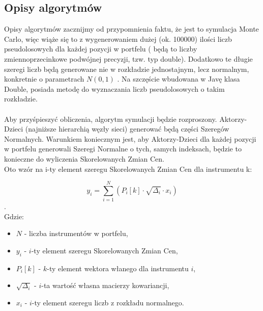 \documentclass[11pt,titlepage]{article}
\numberwithin{equation}{section}
\begin{document}
\subsection{Opisy algorytmów}

Opisy algorytmów zacznijmy od przypomnienia faktu, że jest to symulacja Monte Carlo, więc wiąże się to z wygenerowaniem dużej (ok. 100000) ilości liczb pseudolosowych dla każdej pozycji w portfelu ( będą to liczby zmiennoprzecinkowe podwójnej precyzji, tzw. typ double). Dodatkowo te długie szeregi liczb będą generowane nie w rozkładzie jednostajnym, lecz normalnym, konkretnie o parametrach $ N (0,1) $ . Na szczęście wbudowana w Javę klasa Double, posiada metodę do wyznaczania liczb pseudolosowych o takim rozkładzie.
\\
\\
Aby przyśpieszyć obliczenia, algorytm symulacji będzie rozproszony. Aktorzy-Dzieci (najniższe hierarchią węzły sieci) generować będą części Szeregów Normalnych. Warunkiem koniecznym jest, aby Aktorzy-Dzieci dla każdej pozycji w portfelu generowali Szeregi Normalne o tych, samych indeksach, będzie to konieczne do wyliczenia Skorelowanych Zmian Cen.
\\
Oto wzór na i-ty element szeregu Skorelowanych Zmian Cen dla instrumentu k:

$$y_i=\sum_{i=1}^{N}(P_i[k]\cdot\sqrt{\Delta_i}\cdot x_i)$$.\\

Gdzie:
\begin{itemize}
  \item $N$ - liczba instrumentów w portfelu,
	\item $y_i$ - $i$-ty element szeregu Skorelowanych Zmian Cen,
	\item $P_i[k]$ - $k$-ty element wektora włanego dla instrumentu $i$,
	\item $\sqrt{\Delta_i}$ - $i$-ta wartość własna macierzy kowariancji,
	\item $x_i$ - $i$-ty element szeregu liczb z rozkładu normalnego.

\end{itemize}
\end{document}
